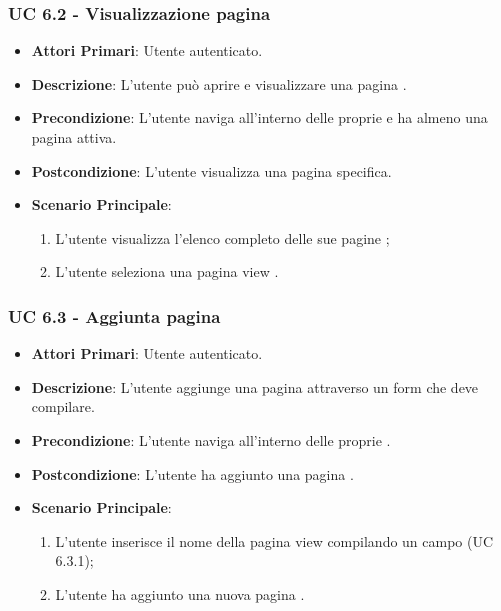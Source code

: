 			\subsubsection{UC 6.2 - Visualizzazione pagina }
			\begin{itemize}
				\item \textbf{Attori Primari}: Utente autenticato.
				\item \textbf{Descrizione}: L'utente può aprire e visualizzare una pagina .
				\item \textbf{Precondizione}: L'utente naviga all'interno delle proprie  e ha almeno una pagina  attiva.
				\item \textbf{Postcondizione}: L'utente visualizza una pagina  specifica.
				\item \textbf{Scenario Principale}:
				\begin{enumerate}
					\item{L'utente visualizza l'elenco completo delle sue pagine ;}
					\item{L'utente seleziona una pagina view .}
				\end{enumerate}	
			\end{itemize}

			\subsubsection{UC 6.3 - Aggiunta pagina }
			\begin{itemize}
				\item \textbf{Attori Primari}: Utente autenticato.
				\item \textbf{Descrizione}: L'utente aggiunge una pagina  attraverso un form che deve compilare.
				\item \textbf{Precondizione}: L'utente naviga all'interno delle proprie .
				\item \textbf{Postcondizione}: L'utente ha aggiunto una pagina .
				\item \textbf{Scenario Principale}:
				\begin{enumerate}
					\item{L'utente inserisce il nome della pagina view compilando un campo (UC 6.3.1);}
					\item{L'utente ha aggiunto una nuova pagina .}
				\end{enumerate}	
			\end{itemize}

